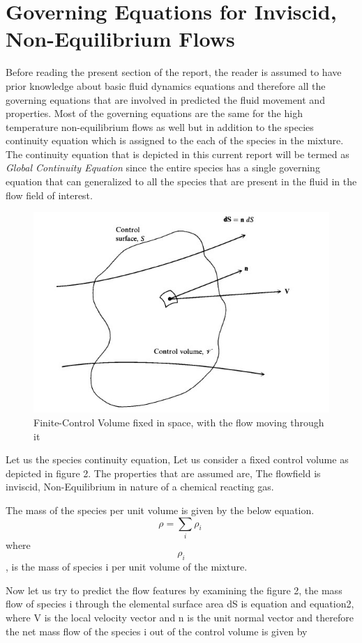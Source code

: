 \section{Governing Equations for Inviscid, Non-Equilibrium Flows}

Before reading the present section of the report, the reader is assumed to have prior knowledge about basic fluid dynamics equations and therefore all the governing equations that are involved in predicted the fluid movement and properties. Most of the governing equations are the same for the high temperature non-equilibrium flows as well but in addition to the species continuity equation which is assigned to the each of the species in the mixture. The continuity equation that is depicted in this current report will be termed as \emph{Global Continuity Equation} since the entire species has a single governing equation that can generalized to all the species that are present in the fluid in the flow field of interest.

\begin{figure}[ht]

\centering
  \includegraphics[width=0.5\linewidth]{images/control_volume.jpg}
  \caption{Finite-Control Volume fixed in space, with the flow moving through it}
  \label{fig:boat1}
\end{figure}

Let us the species continuity equation, Let us consider a fixed control volume as depicted in figure 2. The properties that are assumed are, The flowfield is inviscid, Non-Equilibrium in nature of a chemical reacting gas.

The mass of the species per unit volume is given by the below equation.
\[ \rho = \sum_{i}\rho_i  \ \]
\small where \[\rho_i\],  is the mass of species i per unit volume of the mixture.

Now let us try to predict the flow features by examining the figure 2, the mass flow of species i through the elemental surface
area dS is equation and equation2, where V is the local velocity vector and n is the unit normal vector and therefore the net mass flow of the species i out of the control volume is given by 

